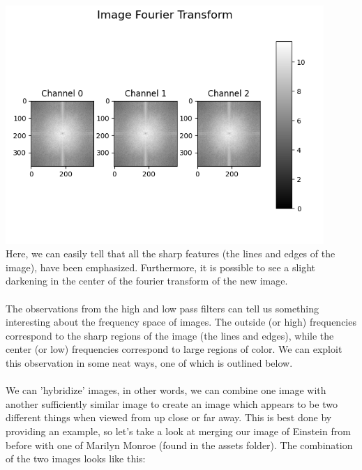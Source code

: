 \documentclass[notitlepage]{article}
\begin{document}
\\
\includegraphics[width=4.75in]{../samples/images/einstein_high15_fourier_transform.png}
\\
Here, we can easily tell that all the sharp features (the lines and edges of the image),
have been emphasized. Furthermore, it is possible to see a slight darkening in the
center of the fourier transform of the new image.
\\\\
The observations from the high and low pass filters can tell us something interesting about
the frequency space of images. The outside (or high) frequencies correspond to the sharp
regions of the image (the lines and edges), while the center (or low) frequencies correspond
to large regions of color. We can exploit this observation in some neat ways, one of which is
outlined below.
\\\\
We can 'hybridize' images, in other words, we can combine one image with another sufficiently similar
image to create an image which appears to be two different things when viewed from up close or far away.
This is best done by providing an example, so let's take a look at merging our image of Einstein from
before with one of Marilyn Monroe (found in the assets folder). The combination of the two images looks like this:
\\
\end{document}

